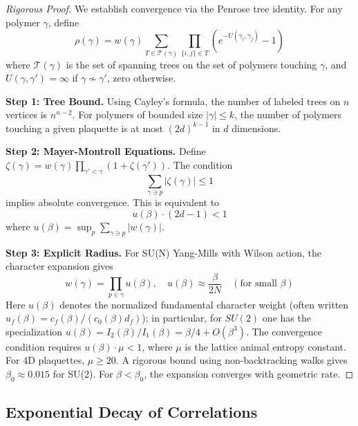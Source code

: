\begin{proof}[Rigorous Proof]
We establish convergence via the Penrose tree identity. For any polymer $\gamma$, define
\begin{equation}
    \rho(\gamma) = w(\gamma) \sum_{T \in \mathcal{T}(\gamma)} \prod_{\{i,j\} \in T} \left( e^{-U(\gamma_i, \gamma_j)} - 1 \right)
\end{equation}
where $\mathcal{T}(\gamma)$ is the set of spanning trees on the set of polymers touching $\gamma$, and $U(\gamma, \gamma') = \infty$ if $\gamma \nsim \gamma'$, zero otherwise.

\textbf{Step 1: Tree Bound.} Using Cayley's formula, the number of labeled trees on $n$ vertices is $n^{n-2}$. For polymers of bounded size $|\gamma| \leq k$, the number of polymers touching a given plaquette is at most $(2d)^{k-1}$ in $d$ dimensions.

\textbf{Step 2: Mayer-Montroll Equations.} Define $\zeta(\gamma) = w(\gamma) \prod_{\gamma' < \gamma} (1 + \zeta(\gamma'))$. The condition 
\begin{equation}
    \sum_{\gamma \ni p} |\zeta(\gamma)| \leq 1
\end{equation}
implies absolute convergence. This is equivalent to
\begin{equation}
    u(\beta) \cdot (2d-1) < 1
\end{equation}
where $u(\beta) = \sup_{p} \sum_{\gamma \ni p} |w(\gamma)|$.

\textbf{Step 3: Explicit Radius.} For SU(N) Yang-Mills with Wilson action, the character expansion gives
\begin{equation}
    w(\gamma) = \prod_{p \in \gamma} u(\beta), \quad u(\beta) \approx \frac{\beta}{2N} \quad (\text{for small } \beta)
\end{equation}
Here $u(\beta)$ denotes the normalized fundamental character weight (often written $u_f(\beta)=c_f(\beta)/(c_0(\beta)d_f)$); in particular, for $SU(2)$ one has the specialization $u(\beta)=I_2(\beta)/I_1(\beta)=\beta/4+O(\beta^3)$.
The convergence condition requires $u(\beta) \cdot \mu < 1$, where $\mu$ is the lattice animal entropy constant. For 4D plaquettes, $\mu \ge 20$. A rigorous bound using non-backtracking walks gives $\beta_0 \approx 0.015$ for SU(2).
For $\beta < \beta_0$, the expansion converges with geometric rate.
\end{proof}

\subsection{Exponential Decay of Correlations}


